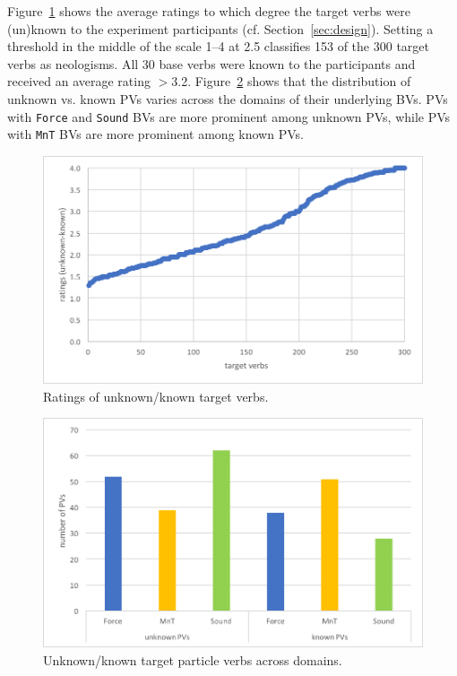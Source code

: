 \documentclass[output=paper]{langsci/langscibook}
\begin{document}
Figure~\ref{fig:neo-ratings} shows the average ratings to which degree
the target verbs were (un)known to the experiment participants
(cf. Section~\ref{sec:design}). Setting a threshold in the middle of
the scale 1--4 at 2.5 classifies 153 of the 300 target verbs as
neologisms. All 30 base verbs were known to the participants and
received an average rating $>$3.2.
Figure~\ref{fig:neo-ratings-domain} shows that the distribution of
unknown vs. known PVs varies across the domains of their underlying
BVs. PVs with \texttt{Force} and \texttt{Sound} BVs are more prominent
among unknown PVs, while PVs with \texttt{MnT} BVs are more prominent
among known PVs.

\begin{figure}[htbp]
  \caption{Ratings of unknown/known target verbs.}
  \label{fig:neo-ratings}
  \includegraphics[width=.9\linewidth]{figures/dataset_neo_ratings.png}
\end{figure}

\begin{figure}[htbp]
  \caption{Unknown/known target particle verbs across domains.}
  \label{fig:neo-ratings-domain}
  \includegraphics[width=.9\linewidth]{figures/dataset_neo_domain_ratings.png}
\end{figure}
\end{document}

